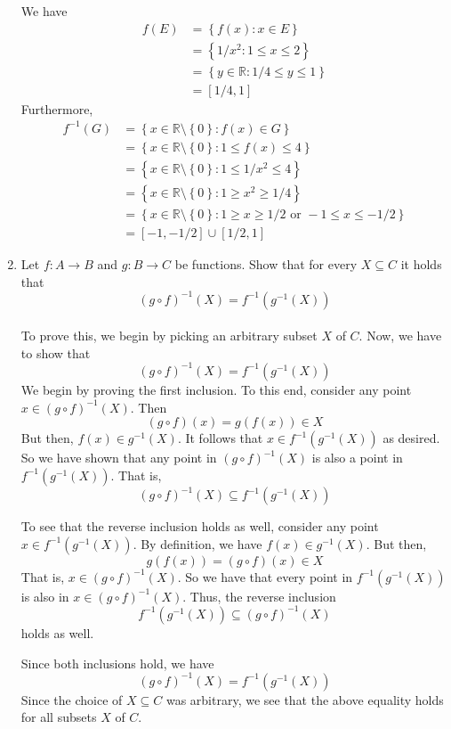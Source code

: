 \documentclass[12pt, reqno]{article}
\numberwithin{equation}{section}
\theoremstyle{definition}
\theoremstyle{remark}
\newcommand{\RR}{\mathbb{R}}
\newcommand{\set}[1]{\left\{#1\right\}}
\begin{document}
\begin{enumerate}[leftmargin=*]
	      We have
	      \begin{align*}
		      f(E) & = \set{f(x) : x\in E}              \\
		           & =\set{1/x^2 : 1\leq x \leq 2}      \\
		           & =\set{y\in \RR : 1/4\leq y \leq 1} \\
		           & =[1/4, 1]
	      \end{align*}
	      Furthermore,
	      \begin{align*}
		      f^{-1}(G) & = \set{x \in \RR\setminus\set{0} :  f(x) \in G}                                      \\
		                & = \set{x \in \RR\setminus\set{0} :  1\leq f(x) \leq 4}                               \\
		                & = \set{x \in \RR\setminus\set{0} :  1\leq 1/x^2 \leq 4}                              \\
		                & = \set{x \in \RR\setminus\set{0} :  1\geq x^2 \geq 1/4}                              \\
		                & = \set{x \in \RR\setminus\set{0} :  1\geq x \geq 1/2 \text{ or } -1\leq x \leq -1/2} \\
		                & = [-1, -1/2] \cup [1/2, 1]
	      \end{align*}

	\item Let $f:A\to B$ and $g:B\to C$ be functions. Show that for every $X\subseteq C$ it holds that
	      \[
		      (g\circ f)^{-1}(X) = f^{-1}\left(g^{-1}(X)\right)
	      \]\\

	      To prove this, we begin by picking an arbitrary subset $X$ of $C$. Now, we have to show that
	      \[
		      (g\circ f)^{-1}(X) = f^{-1}\left(g^{-1}(X)\right)
	      \]
	      We begin by proving the first inclusion. To this end, consider any point $x\in (g\circ f)^{-1}(X)$. Then
	      \[
		      (g\circ f)(x) = g\left(f(x)\right) \in X
	      \]
	      But then, $f(x) \in g^{-1}(X)$. It follows that $x\in f^{-1}\left(g^{-1}(X)\right)$ as desired. So we have shown that any point in $(g\circ f)^{-1}(X)$ is also a point in $f^{-1}\left(g^{-1}(X)\right)$. That is,
	      \[
		      (g\circ f)^{-1}(X) \subseteq f^{-1}\left(g^{-1}(X)\right)
	      \]

	      To see that the reverse inclusion holds as well, consider any point $x\in f^{-1}\left(g^{-1}(X)\right)$. By definition, we have $f(x) \in g^{-1}(X)$. But then,
	      \[
		      g(f(x)) = (g\circ f )(x) \in X
	      \]
	      That is, $x\in (g\circ f)^{-1}(X)$. So we have that every point in $f^{-1}\left(g^{-1}(X)\right)$ is also in $x\in (g\circ f)^{-1}(X)$. Thus, the reverse inclusion
	      \[
		      f^{-1}\left(g^{-1}(X)\right) \subseteq (g\circ f)^{-1}(X)
	      \]
	      holds as well.

	      Since both inclusions hold, we have
	      \[
		      (g\circ f)^{-1}(X) = f^{-1}\left(g^{-1}(X)\right)
	      \]
	      Since the choice of $X\subseteq C$ was arbitrary, we see that the above equality holds for all subsets $X$ of $C$.

\end{enumerate}
\end{document}
